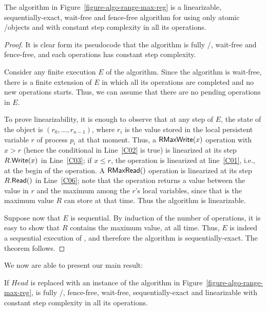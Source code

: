 \begin{theorem}\label{theo-range-max-reg}
The algorithm in Figure~\ref{figure-algo-range-max-reg} is a linearizable, sequentially-exact, wait-free and fence-free algorithm for \RangeMaxReg using only atomic \R/\W objects and with constant step complexity in all its operations.
\end{theorem}

\begin{proof}
It is clear form its pseudocode that the algorithm is fully \R/\W, wait-free and fence-free, and each operations has constant step complexity.

Consider any finite execution \(E\) of the algorithm.  Since the algorithm is wait-free, there is a finite extension of \(E\) in which all its operations are completed and no new operations starts. Thus, we can assume that there are no pending operations in \(E\).

To prove linearizability, it is enough to observe that at any step of \(E\), the state of the object is \((r_0, \hdots, r_{n-1})\), where \(r_i\) is the value stored in the local persistent variable \(r\) of process \(p_i\) at that moment.  Thus, a \({\sf \small RMaxWrite}(x)\) operation with \(x > r\) (hence the conditional in Line~\ref{C02} is {\sf true}) is linearized at its step \(R.{\sf \small Write}(x)\) in Line~\ref{C03}; if \(x \leq r\), the operation is linearized at line~\ref{C01}, i.e., at the begin of the operation.  A \({\sf \small RMaxRead}()\) operation is linearized at its step \(R.{\sf \small Read}()\) in Line~\ref{C06}; note that the operation returns a value between the value in \(r\) and the maximum among the \(r\)'s local variables, since that is the maximum value \(R\) can store at that time. Thus the algorithm is linearizable.

Suppose now that \(E\) is sequential. By induction of the number of operations, it is easy to show that \(R\) contains the maximum value, at all time.  Thus, \(E\) is indeed a sequential execution of \MaxReg, and therefore the algorithm is sequentially-exact. The theorem follows.
\end{proof}

We now are able to present our main result:

\begin{theorem}\label{theo-wf-fully}
If \(Head\) is replaced with an instance of the algorithm in Figure~\ref{figure-algo-range-max-reg}, \NCWSM is fully \R/\W, fence-free, wait-free, sequentially-exact and linearizable with constant step complexity in all its operations.
\end{theorem}

